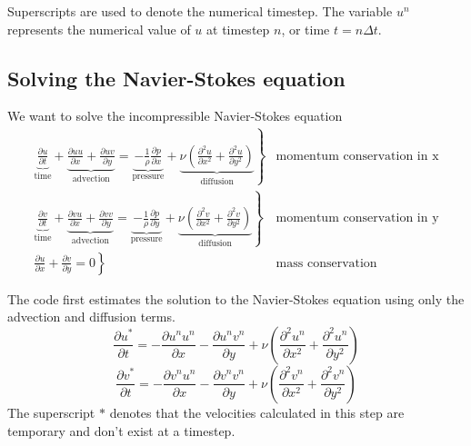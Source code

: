 \documentclass[12pt]{article}
\begin{document}
Superscripts are used to denote the numerical timestep.  The variable $u^n$ represents the numerical value of $u$ at timestep $n$, or time $t=n\Delta t$.

\subsection{Solving the Navier-Stokes equation}
\label{mathBasics}

We want to solve the incompressible Navier-Stokes equation
\begin{align*}
  \left. \underbrace{\frac{\partial u}{\partial t}}_\textrm{time} +  \underbrace{\frac{\partial u u}{\partial x} + \frac{\partial u v}{\partial y}}_\textrm{advection} = \underbrace{- \frac{1}{\rho}\frac{\partial p}{\partial x}}_\textrm{pressure} + \underbrace{\nu \left(\frac{\partial^2 u}{\partial x^2} + \frac{\partial^2 u}{\partial y^2}\right) }_\textrm{diffusion} \right\} &\textrm{momentum conservation in x} \\
  \left. \underbrace{\frac{\partial v}{\partial t}}_\textrm{time} +  \underbrace{\frac{\partial v u}{\partial x} + \frac{\partial v v}{\partial y}}_\textrm{advection} = \underbrace{- \frac{1}{\rho}\frac{\partial p}{\partial y}}_\textrm{pressure} + \underbrace{\nu \left(\frac{\partial^2 v}{\partial x^2} + \frac{\partial^2 v}{\partial y^2}\right) }_\textrm{diffusion} \right\} &\textrm{momentum conservation in y} \\
\left. \frac{\partial u}{\partial x} + \frac{\partial v}{\partial y}  = 0 \right\} &\textrm{mass conservation}
\end{align*}

The code first estimates the solution to the Navier-Stokes equation using only the advection and diffusion terms. 
\begin{equation}
 \frac{\partial u^*}{\partial t} =   -\frac{\partial u^n u^n}{\partial x} -\frac{\partial u^n v^n}{\partial y} + \nu\left( \frac{\partial^2 u^n}{\partial x^2} + \frac{\partial^2 u^n}{\partial y^2}  \right) 
 \label{predictx}
\end{equation}
\begin{equation}
  \frac{\partial v^*}{\partial t} =   -\frac{\partial v^n u^n}{\partial x} -\frac{\partial v^n v^n}{\partial y} + \nu\left( \frac{\partial^2 v^n}{\partial x^2} + \frac{\partial^2 v^n}{\partial y^2}  \right)
 \label{predicty}
\end{equation}
The superscript $*$ denotes that the velocities calculated in this step are temporary and don't exist at a timestep.
\end{document}

